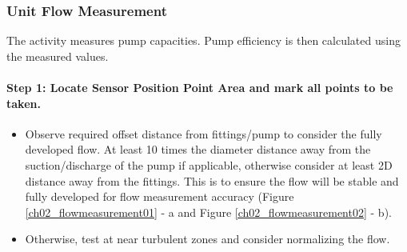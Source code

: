 \subsubsection{Unit Flow Measurement}
The activity measures pump capacities. Pump efficiency is then calculated using the measured values.  

\paragraph{Step 1: Locate Sensor Position Point Area and mark all points to be taken.}
\begin{itemize}
\item Observe required offset distance from fittings/pump to consider the fully developed flow. At least 10 times the diameter distance away from the suction/discharge of the pump if applicable, otherwise consider at least 2D distance away from the fittings. This is to ensure the flow will be stable and fully developed for flow measurement accuracy (Figure \ref{ch02_flowmeasurement01} - a and Figure \ref{ch02_flowmeasurement02} - b).
\item Otherwise, test at near turbulent zones and consider normalizing the flow. 
\end{itemize}

